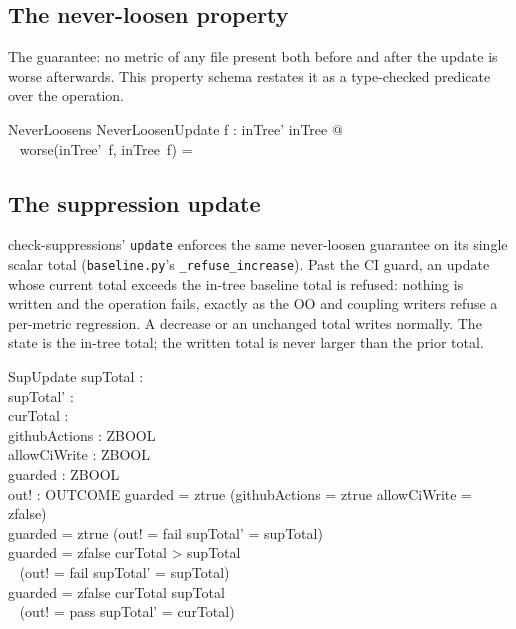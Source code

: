 \documentclass[a4paper,10pt,fleqn]{article}
\begin{document}
\subsection{The never-loosen property}

The guarantee: no metric of any file present both before and after the
update is worse afterwards. This property schema restates it as a
type-checked predicate over the operation.

\begin{schema}{NeverLoosens}
NeverLoosenUpdate
\where
\forall f : \dom inTree' \cap \dom inTree @ \\
\quad~ worse(inTree'~f, inTree~f) = \emptyset
\end{schema}

\subsection{The suppression update}

check-suppressions' \texttt{update} enforces the same never-loosen
guarantee on its single scalar total (\texttt{baseline.py}'s
\texttt{\_refuse\_increase}). Past the CI guard, an update whose current
total exceeds the in-tree baseline total is refused: nothing is written and
the operation fails, exactly as the OO and coupling writers refuse a
per-metric regression. A decrease or an unchanged total writes normally.
The state is the in-tree total; the written total is never larger than the
prior total.

\begin{schema}{SupUpdate}
supTotal : \nat \\
supTotal' : \nat \\
curTotal : \nat \\
githubActions : ZBOOL \\
allowCiWrite : ZBOOL \\
guarded : ZBOOL \\
out! : OUTCOME
\where
guarded = ztrue \iff (githubActions = ztrue \land allowCiWrite = zfalse) \\
guarded = ztrue \implies (out! = fail \land supTotal' = supTotal) \\
guarded = zfalse \land curTotal > supTotal \implies \\
\quad~ (out! = fail \land supTotal' = supTotal) \\
guarded = zfalse \land curTotal \leq supTotal \implies \\
\quad~ (out! = pass \land supTotal' = curTotal)
\end{schema}
\end{document}
